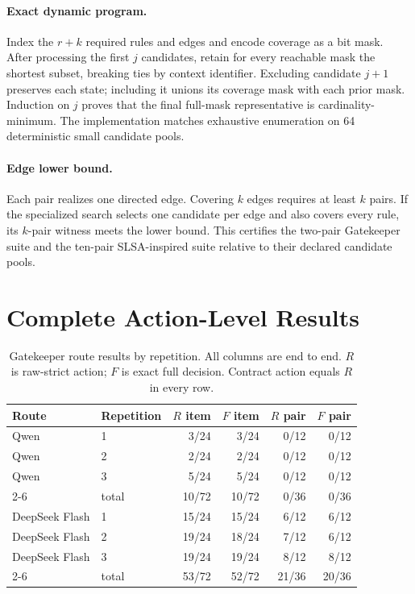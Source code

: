 \documentclass[10pt]{article}
\begin{document}
\paragraph{Exact dynamic program.}
Index the $r+k$ required rules and edges and encode coverage as a bit mask. After processing the
first $j$ candidates, retain for every reachable mask the shortest subset, breaking ties by context
identifier. Excluding candidate $j+1$ preserves each state; including it unions its coverage mask
with each prior mask. Induction on $j$ proves that the final full-mask representative is
cardinality-minimum. The implementation matches exhaustive enumeration on 64 deterministic small
candidate pools.

\paragraph{Edge lower bound.}
Each pair realizes one directed edge. Covering $k$ edges requires at least $k$ pairs. If the
specialized search selects one candidate per edge and also covers every rule, its $k$-pair witness
meets the lower bound. This certifies the two-pair Gatekeeper suite and the ten-pair SLSA-inspired
suite relative to their declared candidate pools.

\section{Complete Action-Level Results}
\label{app:complete-results}

\begin{table}[H]
\centering
\footnotesize
\setlength{\tabcolsep}{3.5pt}
\caption{Gatekeeper route results by repetition. All columns are end to end. $R$ is raw-strict
action; $F$ is exact full decision. Contract action equals $R$ in every row.}
\label{tab:repeat}
\begin{tabular}{@{}llrrrr@{}}
\toprule
Route & Repetition & $R$ item & $F$ item & $R$ pair & $F$ pair \\
\midrule
Qwen & 1 & 3/24 & 3/24 & 0/12 & 0/12 \\
Qwen & 2 & 2/24 & 2/24 & 0/12 & 0/12 \\
Qwen & 3 & 5/24 & 5/24 & 0/12 & 0/12 \\
\cmidrule(lr){2-6}
& total & 10/72 & 10/72 & 0/36 & 0/36 \\
\midrule
DeepSeek Flash & 1 & 15/24 & 15/24 & 6/12 & 6/12 \\
DeepSeek Flash & 2 & 19/24 & 18/24 & 7/12 & 6/12 \\
DeepSeek Flash & 3 & 19/24 & 19/24 & 8/12 & 8/12 \\
\cmidrule(lr){2-6}
& total & 53/72 & 52/72 & 21/36 & 20/36 \\
\bottomrule
\end{tabular}
\end{table}
\end{document}
